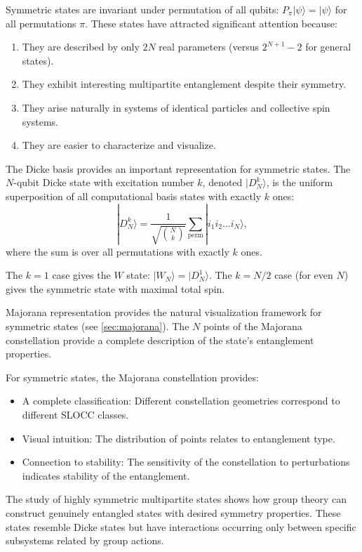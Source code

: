 \documentclass[12pt,a4paper]{article}
\begin{document}
Symmetric states are invariant under permutation of all qubits: $P_\pi |\psi\rangle = |\psi\rangle$ for all permutations $\pi$. These states have attracted significant attention because:
\begin{enumerate}
	\item They are described by only $2N$ real parameters (versus $2^{N+1} - 2$ for general states).
	\item They exhibit interesting multipartite entanglement despite their symmetry.
	\item They arise naturally in systems of identical particles and collective spin systems.
	\item They are easier to characterize and visualize.
\end{enumerate}

The Dicke basis provides an important representation for symmetric states. The $N$-qubit Dicke state with excitation number $k$, denoted $|D_N^k\rangle$, is the uniform superposition of all computational basis states with exactly $k$ ones:
\label{sec:dicke}
\begin{equation}
	|D_N^k\rangle = \frac{1}{\sqrt{\binom{N}{k}}} \sum_{\text{perm}} |i_1 i_2 \ldots i_N\rangle,
\end{equation}
where the sum is over all permutations with exactly $k$ ones.

The $k=1$ case gives the $W$ state: $|W_N\rangle = |D_N^1\rangle$. The $k=N/2$ case (for even $N$) gives the symmetric state with maximal total spin.

Majorana representation provides the natural visualization framework for symmetric states (see \cref{sec:majorana}). The $N$ points of the Majorana constellation provide a complete description of the state's entanglement properties.

For symmetric states, the Majorana constellation provides:
\begin{itemize}
	\item A complete classification: Different constellation geometries correspond to different SLOCC classes.
	\item Visual intuition: The distribution of points relates to entanglement type.
	\item Connection to stability: The sensitivity of the constellation to perturbations indicates stability of the entanglement.
\end{itemize}

The study of highly symmetric multipartite states \cite{burchardt2021} shows how group theory can construct genuinely entangled states with desired symmetry properties. These states resemble Dicke states but have interactions occurring only between specific subsystems related by group actions.
\end{document}

